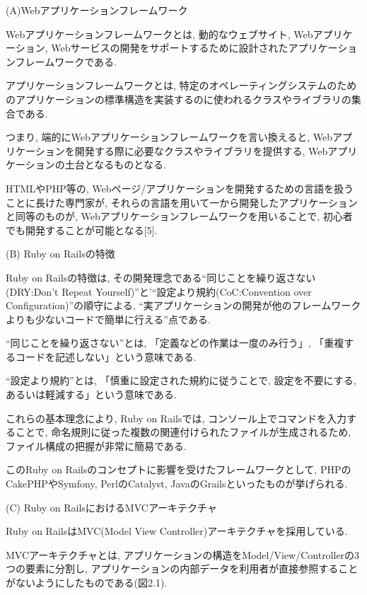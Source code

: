 \begin{description}
\item (A)Webアプリケーションフレームワーク

Webアプリケーションフレームワークとは, 動的なウェブサイト, Webアプリケーション, Webサービスの開発をサポートするために設計されたアプリケーションフレームワークである.

アプリケーションフレームワークとは, 特定のオペレーティングシステムのためのアプリケーションの標準構造を実装するのに使われるクラスやライブラリの集合である.

つまり, 端的にWebアプリケーションフレームワークを言い換えると, Webアプリケーションを開発する際に必要なクラスやライブラリを提供する, Webアプリケーションの土台となるものとなる.

HTMLやPHP等の, Webページ/アプリケーションを開発するための言語を扱うことに長けた専門家が, それらの言語を用いて一から開発したアプリケーションと同等のものが, Webアプリケーションフレームワークを用いることで, 初心者でも開発することが可能となる[5].

\item (B) Ruby on Railsの特徴

Ruby on Railsの特徴は, その開発理念である“同じことを繰り返さない(DRY:Don't Repeat Yourself)”と'“設定より規約(CoC:Convention over Configuration)”の順守による, “実アプリケーションの開発が他のフレームワークよりも少ないコードで簡単に行える”点である.

“同じことを繰り返さない”とは, 「定義などの作業は一度のみ行う」, 「重複するコードを記述しない」という意味である.

“設定より規約”とは, 「慎重に設定された規約に従うことで, 設定を不要にする, あるいは軽減する」という意味である.

これらの基本理念により, Ruby on Railsでは, コンソール上でコマンドを入力することで, 命名規則に従った複数の関連付けられたファイルが生成されるため, ファイル構成の把握が非常に簡易である.

このRuby on Railsのコンセプトに影響を受けたフレームワークとして, PHPのCakePHPやSymfony, PerlのCatalyst, JavaのGrailsといったものが挙げられる.

\item (C) Ruby on RailsにおけるMVCアーキテクチャ

Ruby on RailsはMVC(Model View Controller)アーキテクチャを採用している.

MVCアーキテクチャとは, アプリケーションの構造をModel/View/Controllerの3つの要素に分割し, アプリケーションの内部データを利用者が直接参照することがないようにしたものである(図2.1).


\end{description}
